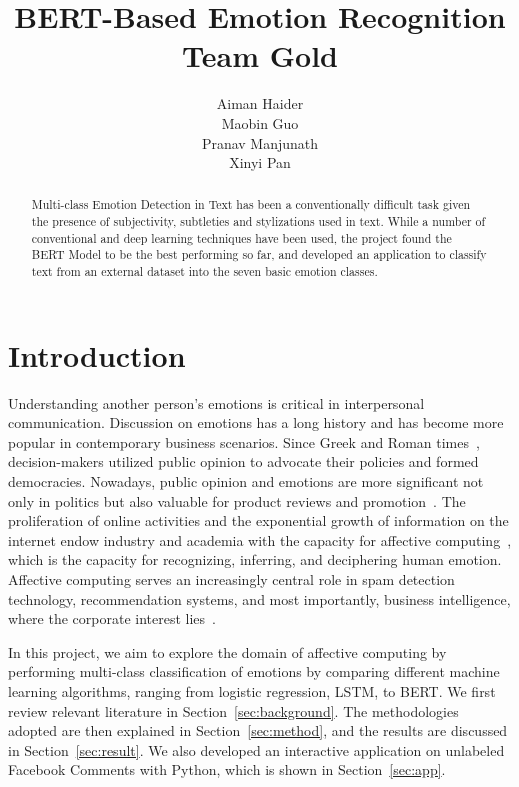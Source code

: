 \documentclass[11pt]{article}
\title{BERT-Based Emotion Recognition\\[0.2em]\smaller{}Team Gold}
\author{
  Aiman Haider \\\And
  Maobin Guo \\\And
  Pranav Manjunath \\\And
  Xinyi Pan}
\date{}
\begin{document}
\maketitle

\begin{abstract}
Multi-class Emotion Detection in Text has been a conventionally difficult task given the presence of subjectivity, subtleties and stylizations used in text. While a number of conventional and deep learning techniques have been used, the project found the BERT Model to be the best performing so far, and developed an application to classify text from an external dataset into the seven basic emotion classes.
\end{abstract}

\section{Introduction}

Understanding another person’s emotions is critical in interpersonal communication. Discussion on emotions has a long history and has become more popular in contemporary business scenarios. Since Greek and Roman times~\cite{affect_rw1}, decision-makers utilized public opinion to advocate their policies and formed democracies. Nowadays, public opinion and emotions are more significant not only in politics but also valuable for product reviews and promotion~\cite{affect_rw2}. The proliferation of online activities and the exponential growth of information on the internet endow industry and academia with the capacity for affective computing~\cite{affect_rw1}, which is the capacity for recognizing, inferring, and deciphering human emotion. Affective computing serves an increasingly central role in spam detection technology, recommendation systems, and most importantly, business intelligence, where the corporate interest lies~\cite{affect_rw2}.  

In this project, we aim to explore the domain of affective computing by performing multi-class classification of emotions by comparing different machine learning algorithms, ranging from logistic regression, LSTM, to BERT. We first review relevant literature in Section~\ref{sec:background}. The methodologies adopted are then explained in Section~\ref{sec:method}, and the results are discussed in Section~\ref{sec:result}. We also developed an interactive application on unlabeled Facebook Comments with Python, which is shown in Section~\ref{sec:app}.
\end{document}
